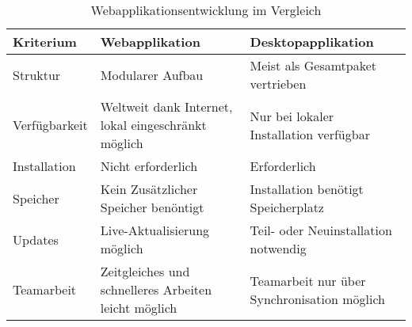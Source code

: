 \begin{table}[H]
	\centering
	\caption{Webapplikationsentwicklung im Vergleich \cite{TecArt-GmbH2019:online}}
	\label{tab:spektrometer}
	\begin{tabular}{l | p{5cm}|  p{5cm}}
		\textbf{Kriterium} & \textbf{Webapplikation} & \textbf{Desktopapplikation}   \\ 
		\hline 
		Struktur & Modularer Aufbau & Meist als Gesamtpaket vertrieben \\
		\hline 
		Verfügbarkeit & Weltweit dank Internet, lokal eingeschränkt möglich & Nur bei lokaler Installation verfügbar \\ 
		\hline 
		Installation	& Nicht erforderlich & Erforderlich   \\ 
		Speicher & Kein Zusätzlicher Speicher benöntigt & Installation benötigt Speicherplatz \\
		\hline 
		Updates & Live-Aktualisierung möglich & Teil- oder Neuinstallation notwendig \\		
		\hline 
		Teamarbeit & Zeitgleiches und schnelleres Arbeiten leicht möglich & Teamarbeit nur über Synchronisation möglich \\
		\hline 
	\end{tabular} 
\end{table}

